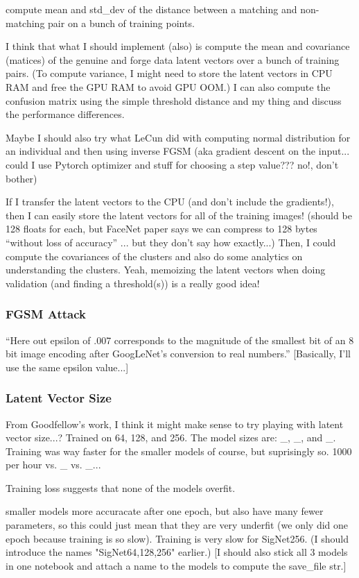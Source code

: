compute mean and std\_dev of the distance between a matching and non-matching pair on a bunch of training points.

I think that what I should implement (also) is compute the mean and covariance (matices) of the genuine and forge data latent vectors over a bunch of training pairs. (To compute variance, I might need to store the latent vectors in CPU RAM and free the GPU RAM to avoid GPU OOM.)
I can also compute the confusion matrix using the simple threshold distance and my thing and discuss the performance differences.

Maybe I should also try what LeCun did with computing normal distribution for an individual and then using inverse FGSM (aka gradient descent on the input... could I use Pytorch optimizer and stuff for choosing a step value??? no!, don't bother)

If I transfer the latent vectors to the CPU (and don't include the gradients!), then I can easily store the latent vectors for all of the training images!
(should be 128 floats for each, but FaceNet paper says we can compress to 128 bytes ``without loss of accuracy'' ... but they don't say how exactly...)
Then, I could compute the covariances of the clusters and also do some analytics on understanding the clusters.
Yeah, memoizing the latent vectors when doing validation (and finding a threshold(s)) is a really good idea!

\subsubsection{FGSM Attack}
``Here out epsilon of .007 corresponds to the magnitude of the
smallest bit of an 8 bit image encoding after GoogLeNet's conversion to real numbers.''\cite{goodfellow}
[Basically, I'll use the same epsilon value...]

\subsubsection{Latent Vector Size}
From Goodfellow's work, I think it might make sense to try playing with latent vector size...?
Trained on 64, 128, and 256.
The model sizes are: \_, \_, and \_.
Training was way faster for the smaller models of course, but suprisingly so.
1000 per hour vs. \_ vs. \_...

Training loss suggests that none of the models overfit.

smaller models more accuracate after one epoch, but also have many fewer parameters, so this could just mean that they are very underfit (we only did one epoch because training is so slow).
Training is very slow for SigNet256.
(I should introduce the names "SigNet64,128,256" earlier.)
[I should also stick all 3 models in one notebook and attach a name to the models to compute the save\_file str.]

